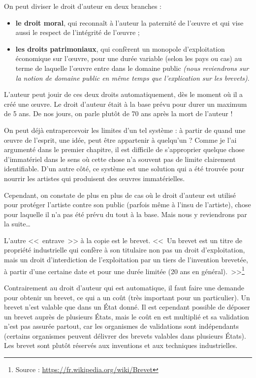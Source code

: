 On peut diviser le droit d'auteur en deux branches :
\begin{itemize}
\item \textbf{le droit moral}, qui reconnaît à l'auteur la paternité de l'œuvre et qui vise aussi le respect de l'intégrité de l'œuvre ;
\item \textbf{les droits patrimoniaux}, qui confèrent un monopole d'exploitation économique sur l'œuvre, pour une durée variable (selon les pays ou cas) au terme de laquelle l'œuvre entre dans le domaine public \textit{(nous reviendrons sur la notion de domaine public en même temps que l'explication sur les brevets)}.
\end{itemize}\bigskip

L'auteur peut jouir de ces deux droits automatiquement, dès le moment où il a créé une œuvre.
Le droit d'auteur était à la base prévu pour durer un maximum de 5 ans.
De nos jours, on parle plutôt de 70 ans après la mort de l'auteur !

On peut déjà entrapercevoir les limites d'un tel système : à partir de quand une œuvre de l'esprit, une idée, peut être appartenir à quelqu'un ?
Comme je l'ai argumenté dans le premier chapitre, il est difficile de s'approprier quelque chose d'immatériel dans le sens où cette chose n'a souvent pas de limite clairement identifiable.
D'un autre côté, ce système est une solution qui a été trouvée pour nourrir les artistes qui produisent des œuvres immatérielles.

Cependant, on constate de plus en plus de cas où le droit d'auteur est utilisé pour protéger l'artiste contre son public (parfois même à l'insu de l'artiste), chose pour laquelle il n'a pas été prévu du tout à la base.
Mais nous y reviendrons par la suite\dots{}

L'autre <<~entrave~>> à la copie est le brevet.
<<~Un brevet est un titre de propriété industrielle qui confère à son titulaire non pas un droit d'exploitation, mais un droit d'interdiction de l'exploitation par un tiers de l'invention brevetée, à partir d'une certaine date et pour une durée limitée (20 ans en général).~>>\footnote{Source : \url{https://fr.wikipedia.org/wiki/Brevet}}

Contrairement au droit d'auteur qui est automatique, il faut faire une demande pour obtenir un brevet, ce qui a un coût (très important pour un particulier).
Un brevet n'est valable que dans un État donné.
Il est cependant possible de déposer un brevet auprès de plusieurs États, mais le coût en est multiplié et sa validation n'est pas assurée partout, car les organismes de validations sont indépendants (certains organismes peuvent délivrer des brevets valables dans plusieurs États).
Les brevet sont plutôt réservés aux inventions et aux techniques industrielles.

